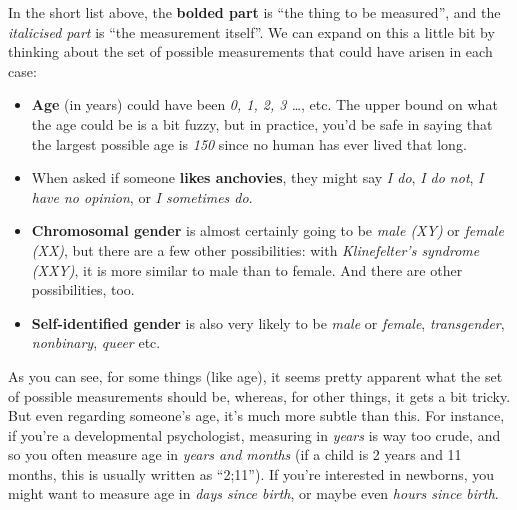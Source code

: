 \documentclass[
]{book}
\providecommand{\tightlist}{%
  \setlength{\itemsep}{0pt}\setlength{\parskip}{0pt}}
\theoremstyle{definition}
\theoremstyle{definition}
\theoremstyle{definition}
\theoremstyle{definition}
\theoremstyle{remark}
\begin{document}
In the short list above, the \textbf{bolded part} is ``the thing to be measured'', and the \emph{italicised part} is ``the measurement itself''. We can expand on this a little bit by thinking about the set of possible measurements that could have arisen in each case:

\begin{itemize}
\tightlist
\item
  \textbf{Age} (in years) could have been \emph{0, 1, 2, 3 \ldots{}}, etc. The upper bound on what the age could be is a bit fuzzy, but in practice, you'd be safe in saying that the largest possible age is \emph{150} since no human has ever lived that long.
\item
  When asked if someone \textbf{likes anchovies}, they might say \emph{I do}, \emph{I do not}, \emph{I have no opinion}, or \emph{I sometimes do}.
\item
  \textbf{Chromosomal gender} is almost certainly going to be \emph{male (XY)} or \emph{female (XX)}, but there are a few other possibilities: with \emph{Klinefelter's syndrome (XXY)}, it is more similar to male than to female. And there are other possibilities, too.
\item
  \textbf{Self-identified gender} is also very likely to be \emph{male} or \emph{female}, \emph{transgender}, \emph{nonbinary}, \emph{queer} etc.
\end{itemize}

As you can see, for some things (like age), it seems pretty apparent what the set of possible measurements should be, whereas, for other things, it gets a bit tricky. But even regarding someone's age, it's much more subtle than this. For instance, if you're a developmental psychologist, measuring in \emph{years} is way too crude, and so you often measure age in \emph{years and months} (if a child is 2 years and 11 months, this is usually written as ``2;11''). If you're interested in newborns, you might want to measure age in \emph{days since birth}, or maybe even \emph{hours since birth}.
\end{document}
